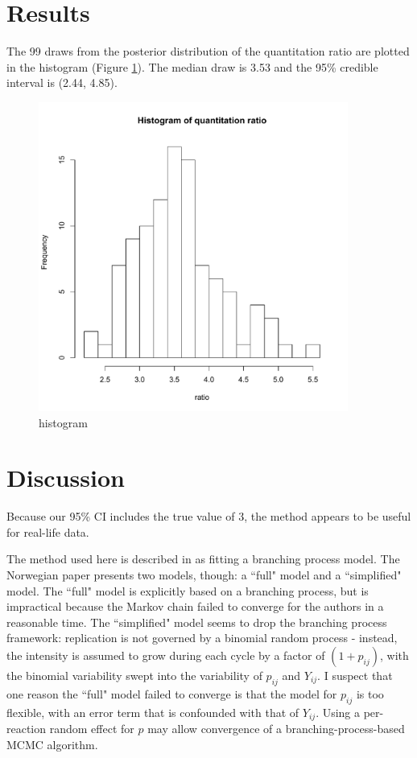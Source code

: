 \documentclass[12pt]{article}
\begin{document}
\section{Results}
The 99 draws from the posterior distribution of the quantitation ratio are plotted in the histogram (Figure \ref{qr}). The median draw is 3.53 and the 95\% credible interval is (2.44, 4.85).

\begin{figure}[hb]
  \centering
  \includegraphics[width=4in]{figures/quantitation_ratio}
  \caption{histogram}
  \label{qr}
\end{figure}

\section{Discussion}
Because our 95\% CI includes the true value of 3, the method appears to be useful for real-life data.

The method used here is described in \cite{norway:2010} as fitting a branching process model. The Norwegian paper \cite{norway:2010} presents two models, though: a ``full" model and a ``simplified" model. The ``full" model is explicitly based on a branching process, but is impractical because the Markov chain failed to converge for the authors in a reasonable time. The ``simplified" model seems to drop the branching process framework: replication is not governed by a binomial random process - instead, the intensity is assumed to grow during each cycle by a factor of $(1+p_{ij})$, with the binomial variability swept into the variability of $p_{ij}$ and $Y_{ij}$. I suspect that one reason the ``full" model failed to converge is that the model for $p_{ij}$ is too flexible, with an error term that is confounded with that of $Y_{ij}$. Using a per-reaction random effect for $p$ may allow convergence of a branching-process-based MCMC algorithm.\\
\end{document}

